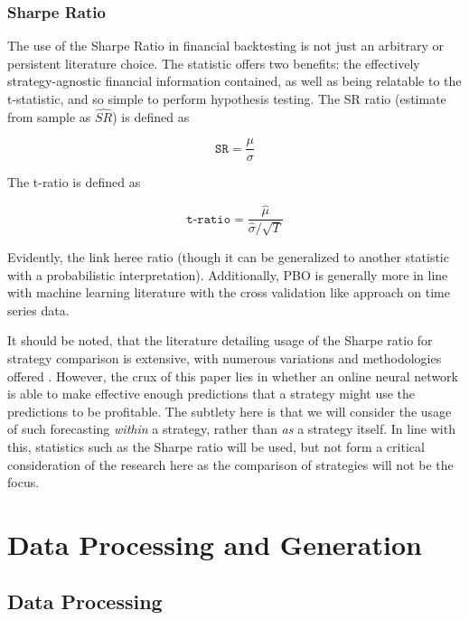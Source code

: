 \documentclass[a4paper,11pt,oneside]{article}
\theoremstyle{plain}
\theoremstyle{definition}
\begin{document}
\subsubsection {Sharpe Ratio}

The use of the Sharpe Ratio in financial backtesting is not just an arbitrary or persistent literature choice. 
The statistic offers two benefits: the effectively strategy-agnostic financial information contained, as well as being 
relatable to the t-statistic, and so simple to perform hypothesis testing. The SR ratio (estimate from sample as $\hat{SR}$) 
is defined as

\begin{equation}\label{SR}
  \texttt{SR}=\frac{\mu}{\sigma}
\end{equation}

The t-ratio is defined as 

\begin{equation}\label{tratio}
  \texttt{t-ratio} = \frac{\hat{\mu}}{\hat{\sigma}/\sqrt{T}}
\end{equation}

Evidently, the link heree ratio (though it can be generalized to another statistic with a probabilistic interpretation). Additionally, 
PBO is generally more in line with machine learning literature with the cross validation like approach on time series data.  
\hfill \break 

It should be noted, that the literature detailing usage of the Sharpe ratio for strategy comparison is extensive, with 
numerous variations and methodologies offered \cite{BaileySharpe}. However, the crux of this paper lies 
in whether an online neural network is able to make effective enough predictions that a strategy might use the 
predictions to be profitable. The subtlety here is that we will consider the usage of such forecasting \textit{within} a strategy,
 rather than \textit{as} a strategy itself. In line with this, statistics such as the Sharpe ratio will be used, but not form a critical 
 consideration of the research here as the comparison of strategies will not be the focus.
\hfill \break 

\newpage


\section{Data Processing and Generation }\label{Data}
\subsection{Data Processing}\label{data_processing}
\end{document}
